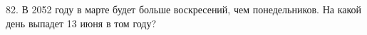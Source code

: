 82. В 2052 году в марте будет больше воскресений, чем понедельников. На какой день выпадет 13 июня в том году?\\
